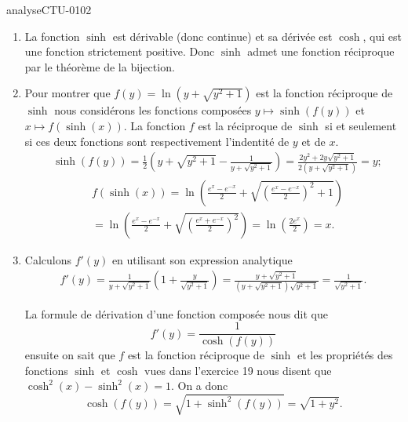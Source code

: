 
\begin{corrige}{analyseCTU-0102}    

\begin{enumerate}
      \item La fonction $\sinh$ est d\'erivable (donc continue) et sa d\'eriv\'ee est $\cosh$, qui est une fonction strictement positive. Donc $\sinh$ admet une fonction réciproque par le th\'eor\`eme de la bijection. 
      \item Pour montrer que $f(y) = \ln(y + \sqrt{y^2+1})$ est la fonction réciproque de $\sinh$ nous consid\'erons les fonctions compos\'ees $y\mapsto \sinh(f(y))$ et $x\mapsto f(\sinh(x))$. La fonction $f$ est la r\'eciproque de $\sinh$ si et seulement si ces deux fonctions sont respectivement l'indentit\'e de $y$ et de $x$. 
        \begin{align*}
          &\sinh(f(y)) = \frac{1}{2}\left(y+\sqrt{y^2 +1}- \frac{1}{y+\sqrt{y^2 +1}} \right) =\frac{2y^2 + 2y\sqrt{y^2+1}}{2(y+\sqrt{y^2 +1})} = y ;
        \end{align*}
        \begin{align*}
          & f(\sinh(x)) = \ln\left(\frac{e^x - e^{-x}}{2} + \sqrt{\left(\frac{e^x - e^{-x}}{2}\right)^2 +1}\right) \\
          &=\ln\left(\frac{e^x - e^{-x}}{2} + \sqrt{\left(\frac{e^x + e^{-x}}{2}\right)^2}\right)  = \ln\left(\frac{2e^x }{2}\right) = x.
        \end{align*}
      \item Calculons $f'(y)$  en utilisant son expression analytique
        \begin{align*}
          f'(y) = \frac{1}{y+\sqrt{y^2 +1}} \left(1+ \frac{y}{\sqrt{y^2 +1}}\right)= \frac{y+\sqrt{y^2 +1}}{(y+\sqrt{y^2 +1})\sqrt{y^2 +1}} = \frac{1}{\sqrt{y^2 +1}}.
        \end{align*}

 La formule de dérivation d'une fonction composée nous dit que 
 \begin{equation*}
   f'(y) = \frac{1}{\cosh(f(y))}
 \end{equation*}
ensuite on sait que $f$ est la fonction r\'eciproque de $\sinh$ 
 et les propriétés des fonctions $\sinh$ et $\cosh$ vues dans l'exercice 19
 nous disent que $\cosh^2(x) -\sinh^2(x) = 1$. On a donc 
 \begin{equation*}
   \cosh(f(y)) = \sqrt{1+ \sinh^2(f(y))} = \sqrt{1+y^2}.
 \end{equation*}
    \end{enumerate}
\end{corrige}
